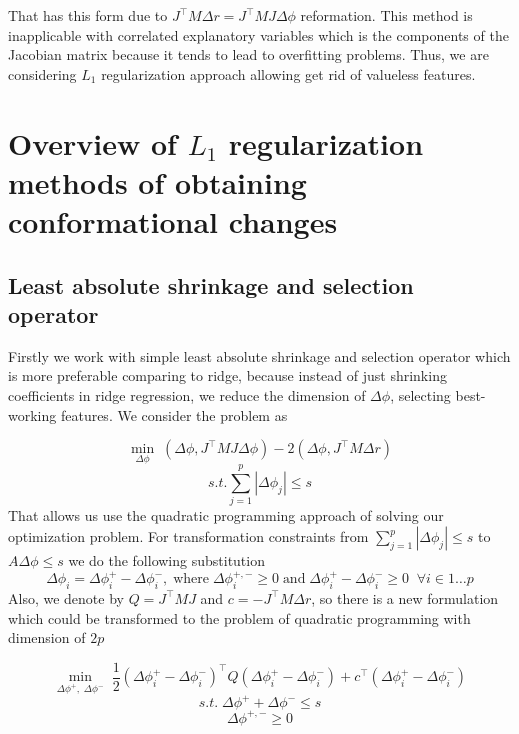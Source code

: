 \documentclass[12pt,twoside]{article}
\newcommand\red[1]{{\color{red}#1}}
\begin{document}
That has this form due to $J^{\top}M\Delta r = J^{\top}M J \Delta \phi$ reformation. This method is inapplicable with correlated explanatory variables which is the components of the Jacobian matrix because it tends to lead to overfitting problems. Thus, we are considering $L_1$ regularization approach allowing get rid of valueless features. 
 
 \section{Overview of $L_1$ regularization methods of obtaining conformational changes }
 
 \subsection{\small{Least absolute shrinkage and selection operator}}
 Firstly we work with simple least absolute shrinkage and selection operator which is more preferable comparing to ridge, because instead of just shrinking coefficients in ridge regression, we reduce the dimension of $\Delta\phi$, selecting best-working features. 
 We consider the problem as 
 
$$\min_{\Delta \phi} \; (\Delta \phi, J^{\top}MJ \Delta \phi)-2(\Delta \phi, J^{\top}M\Delta r)$$
$$s.t. \sum\limits_{j=1}^{p} |\Delta\phi_j| \leqslant  s$$
That allows us use the quadratic programming approach of solving our optimization problem. For transformation constraints from  $\sum\limits_{j=1}^{p} |\Delta\phi_j| \leqslant s$ to $A\Delta\phi\leqslant s$ we do the following substitution $$\Delta\phi_i = \Delta\phi_i^+ - \Delta\phi_i^-, \; \text{where}  \;\Delta\phi_i^{+,-} \geqslant 0 \;\text{and}\; \Delta\phi_i^+ - \Delta\phi_i^- \geqslant 0 \;\;\forall i \in 1\dots p$$
Also, we denote by $Q=J^{\top}MJ$ and $c = -J^{\top}M\Delta r$, so there is a new formulation which could be transformed to the problem of quadratic programming with dimension of $2p$

$$ \min_{\Delta \phi^+,\; \Delta \phi^-} \; \frac{1}{2}(\Delta\phi_i^+ - \Delta\phi_i^-)^{\top}Q(\Delta\phi_i^+ - \Delta\phi_i^-) + c^{\top}(\Delta\phi_i^+ - \Delta\phi_i^-)$$
$$ s.t. \;\Delta \phi^+ + \Delta \phi^- \leqslant s$$
$$\Delta \phi^{+,-}\geqslant 0$$
\end{document}
